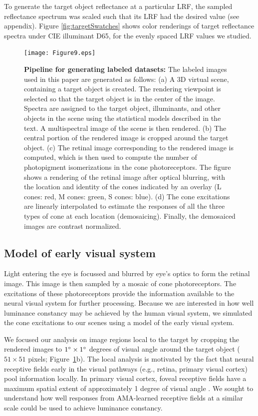 \documentclass{jov}
\begin{document}
To generate the target object reflectance at a particular LRF, the sampled reflectance spectrum was 
scaled such that its LRF had the desired value (see appendix).
Figure \ref{fig:targetSwatches} shows color renderings of target reflectance spectra under CIE illuminant D65, for the evenly spaced LRF values we studied.

\begin{figure}
\centering
    \texttt{[image: Figure9.eps]}
    \label{fig:sceneWithCroppedImage}
    \caption{{\bf Pipeline for generating labeled datasets:}  The labeled images used in this paper are generated as follows: (a) A 3D virtual scene, containing a target object is created. The rendering viewpoint is selected so that the target object is in the center of the image. Spectra are assigned to the target object, illuminants, and other objects in the scene using the statistical models described in the text. A multispectral image of the scene is then rendered. (b) The central portion of the rendered image is cropped around the target object. (c) The retinal image corresponding to the rendered image is computed, which is then used to compute the number of photopigment isomerizations in the cone photoreceptors. The figure shows a rendering of the retinal image after optical blurring, with the location and identity of the cones indicated by an overlay (L cones: red, M cones: green, S cones: blue).  (d) The cone excitations are linearly interpolated to estimate the responses of all the three types of cone at each location (demosaicing). Finally, the demosaiced images are contrast normalized.}
\label{fig:figure9}
\end{figure}

\subsection{Model of early visual system} \label{method:Isetbio}
Light entering the eye is focussed and blurred by eye's optics to form the retinal image.
This image is then sampled by a mosaic of cone photoreceptors.
The excitations of these photoreceptors provide the information available to the neural visual system for further processing.
Because we are interested in how well luminance constancy may be achieved by the human visual system, we simulated the cone excitations
to our scenes using a model of the early visual system.

We focused our analysis on image regions local to the target by cropping the rendered images to $1\degree \times 1\degree$ degrees of visual angle around the target object ($51 \times 51$ pixels; Figure~\ref{fig:figure9}b).
The local analysis is motivated by the fact that neural receptive fields early in the visual pathways (e.g., retina, primary visual cortex) pool information locally. 
In primary visual cortex, foveal receptive fields have a maximum spatial extent of approximately 1 degree of visual angle \cite{gattass1981visual, gattass1988visuotopic}. 
We sought to understand how well responses from AMA-learned receptive fields at a similar scale could be used to achieve luminance constancy.
\end{document}
